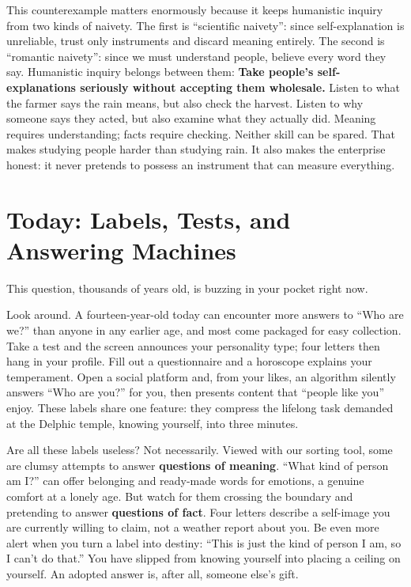 This counterexample matters enormously because it keeps humanistic inquiry from two kinds of naivety. The first is ``scientific naivety'': since self-explanation is unreliable, trust only instruments and discard meaning entirely. The second is ``romantic naivety'': since we must understand people, believe every word they say. Humanistic inquiry belongs between them: \textbf{Take people's self-explanations seriously without accepting them wholesale.} Listen to what the farmer says the rain means, but also check the harvest. Listen to why someone says they acted, but also examine what they actually did. Meaning requires understanding; facts require checking. Neither skill can be spared. That makes studying people harder than studying rain. It also makes the enterprise honest: it never pretends to possess an instrument that can measure everything.

\section{Today: Labels, Tests, and Answering Machines}
This question, thousands of years old, is buzzing in your pocket right now.

Look around. A fourteen-year-old today can encounter more answers to ``Who are we?'' than anyone in any earlier age, and most come packaged for easy collection. Take a test and the screen announces your personality type; four letters then hang in your profile. Fill out a questionnaire and a horoscope explains your temperament. Open a social platform and, from your likes, an algorithm silently answers ``Who are you?'' for you, then presents content that ``people like you'' enjoy. These labels share one feature: they compress the lifelong task demanded at the Delphic temple, knowing yourself, into three minutes.

Are all these labels useless? Not necessarily. Viewed with our sorting tool, some are clumsy attempts to answer \textbf{questions of meaning}. ``What kind of person am I?'' can offer belonging and ready-made words for emotions, a genuine comfort at a lonely age. But watch for them crossing the boundary and pretending to answer \textbf{questions of fact}. Four letters describe a self-image you are currently willing to claim, not a weather report about you. Be even more alert when you turn a label into destiny: ``This is just the kind of person I am, so I can't do that.'' You have slipped from knowing yourself into placing a ceiling on yourself. An adopted answer is, after all, someone else's gift.

